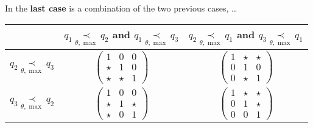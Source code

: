 In the \textbf{last case} is a combination of the two previous cases, \dots
\begin{center}
  \begin{tabular}{c|c|c}
    \multicolumn{1}{c|}{} & 
    $q_1 \underset{\theta,\max}{\prec} q_2$ and
    $q_1 \underset{\theta,\max}{\prec} q_3$
    &
    $q_2 \underset{\theta,\max}{\prec} q_1$ and
    $q_3 \underset{\theta,\max}{\prec} q_1$
    \tabularnewline
    \hline 
    $q_2 \underset{\theta,\max}{\prec} q_3$ & $\begin{pmatrix}1 & 0 & 0\\
    \star & 1 & 0\\
    \star & \star & 1
  \end{pmatrix}$ & $\begin{pmatrix}1 & \star & \star\\
    0 & 1 & 0\\
    0 & \star & 1
  \end{pmatrix}$\tabularnewline
  \hline 
  $q_3 \underset{\theta,\max}{\prec} q_2$ & $\begin{pmatrix}1 & 0 & 0\\
  \star & 1 & \star\\
  \star & 0 & 1
  \end{pmatrix}$ & $\begin{pmatrix}1 & \star & \star\\
  0 & 1 & \star\\
  0 & 0 & 1
  \end{pmatrix}$\tabularnewline
  \end{tabular}
  \TODO[correct?]
\end{center}

